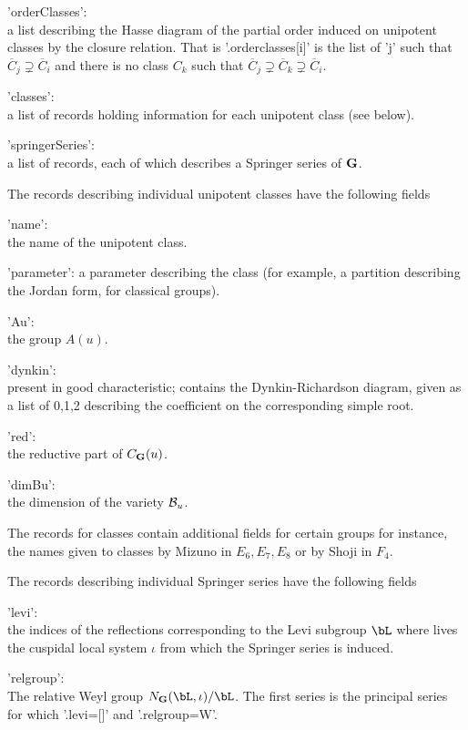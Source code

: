 'orderClasses':\\  a list describing the Hasse diagram of the partial order
induced   on   unipotent   classes   by   the  closure  relation.  That  is
'.orderclasses[i]'  is the list of 'j' such that ${\overline C}_j\supsetneq
{\overline  C}_i$  and  there  is  no  class  $C_k$  such  that ${\overline
C}_j\supsetneq {\overline C}_k\supsetneq {\overline C}_i$.

'classes':\\  a  list  of  records  holding information for each unipotent
class (see below).

'springerSeries':\\  a list of records, each  of which describes a Springer
series  of ${\bf G}$.

The  records  describing  individual  unipotent  classes have the following
fields\:

'name':\\ the name of the unipotent class.

'parameter':  a parameter  describing the  class (for  example, a partition
describing the Jordan form, for classical groups).

'Au':\\ the group $A(u)$.

'dynkin':\\  present in good characteristic; contains the Dynkin-Richardson
diagram,  given  as  a  list  of  0,1,2  describing  the coefficient on the
corresponding simple root.

'red':\\  the reductive part of $C_{\bf G}(u)$.

'dimBu':\\  the dimension of the variety ${\mathcal B}_u$.

The  records for classes contain additional fields for certain groups\: for
instance,  the names given  to classes by  Mizuno in $E_6,  E_7, E_8$ or by
Shoji in $F_4$.

The  records  describing  individual  Springer  series  have  the following
fields\:

'levi':\\the  indices of the reflections corresponding to the Levi subgroup
$\bL$ where lives the cuspidal local system $\iota$ from which the Springer
series is induced.

'relgroup':\\  The  relative  Weyl  group $N_\bG(\bL,\iota)/\bL$. The first
series is the principal series for which '.levi=[]' and '.relgroup=W'.

